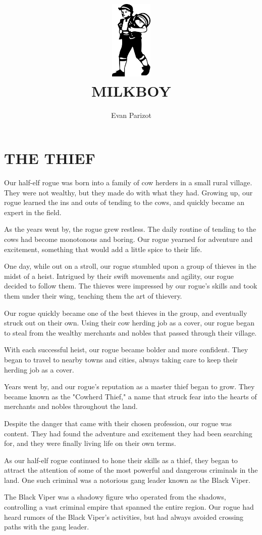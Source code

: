 \documentclass[ms,a4paper]{memoir}
\title{\includegraphics[width=2cm]{MILKBOY.png}\\[2cm]MILKBOY}
\author{Evan Parizot}
\date{}
\newcommand{\RED}[1]{\textcolor{red!50!black}{\MakeUppercase{#1}}}
\begin{document}
\maketitle
\chapter{\RED{The Thief}}

Our half-elf rogue was born into a family of cow herders in a small rural 
village. They were not wealthy, but they made do with what they had. Growing 
up, our rogue learned the ins and outs of tending to the cows, and quickly 
became an expert in the field.

As the years went by, the rogue grew restless. The daily routine of tending to 
the cows had become monotonous and boring. Our rogue yearned for adventure and 
excitement, something that would add a little spice to their life.

One day, while out on a stroll, our rogue stumbled upon a group of thieves in 
the midst of a heist. Intrigued by their swift movements and agility, our rogue 
decided to follow them. The thieves were impressed by our rogue's skills and 
took them under their wing, teaching them the art of thievery.

Our rogue quickly became one of the best thieves in the group, and eventually 
struck out on their own. Using their cow herding job as a cover, our rogue 
began to steal from the wealthy merchants and nobles that passed through their village.

With each successful heist, our rogue became bolder and more confident. They 
began to travel to nearby towns and cities, always taking care to keep their 
herding job as a cover.

Years went by, and our rogue's reputation as a master thief began to grow. They 
became known as the "Cowherd Thief," a name that struck fear into the hearts of 
merchants and nobles throughout the land.

Despite the danger that came with their chosen profession, our rogue was content. 
They had found the adventure and excitement they had been searching for, and they 
were finally living life on their own terms.

As our half-elf rogue continued to hone their skills as a thief, they began to 
attract the attention of some of the most powerful and dangerous criminals in the
 land. One such criminal was a notorious gang leader known as the Black Viper.

The Black Viper was a shadowy figure who operated from the shadows, controlling 
a vast criminal empire that spanned the entire region. Our rogue had heard rumors
 of the Black Viper's activities, but had always avoided crossing paths with 
 the gang leader.
\end{document}
